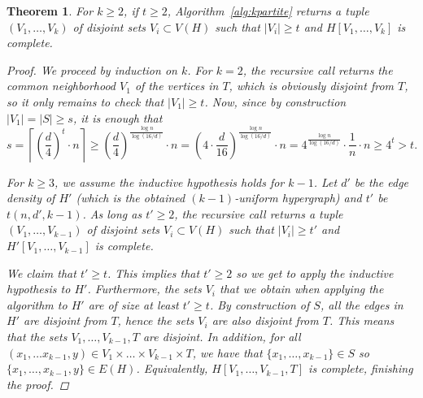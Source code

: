 \documentclass{amsart}
\newtheorem{theorem}[subsection]{Theorem}
\begin{document}
\begin{theorem}
    For $k \geq 2$, if $t \geq 2$, Algorithm~\ref{alg:kpartite} returns a tuple $(V_1, \dots, V_k)$ of disjoint sets $V_i \subset V(H)$ such that
    $|V_i| \geq t$ and $H[V_1, \dots, V_k]$ is complete.

    \begin{proof}
        We proceed by induction on $k$.
        For $k=2$, the recursive call returns the common neighborhood $V_1$ of the vertices in $T$,
        which is obviously disjoint from $T$, so it only remains to check that $|V_1| \geq t$.
        Now, since by construction $|V_1| = |S| \geq s$, it is enough that
        \[
            s
            = \left\lceil \left( \frac{d}{4}\right)^t \cdot n\right\rceil
            \geq \left( \frac{d}{4}\right)^{\frac{\log n}{\log(16/d)}}  \cdot n
            = \left( 4 \cdot \frac{d}{16}\right)^{\frac{\log n}{\log(16/d)}} \cdot n
            = 4^{\frac{\log n}{\log(16/d)}} \cdot \frac{1}{n} \cdot n
            \geq 4^t
            > t.
        \]

        For $k \geq 3$, we assume the inductive hypothesis holds for $k-1$.
        Let $d'$ be the edge density of $H'$ (which is the obtained $(k-1)$-uniform hypergraph)
        and $t'$ be $t(n, d', k-1)$.
        As long as $t' \geq 2$, the recursive call returns
        a tuple $(V_1, \dots, V_{k-1})$ of disjoint sets $V_i \subset V(H)$ such that
        $|V_i| \geq t'$ and $H'[V_1, \dots, V_{k-1}]$ is complete.

        We claim that $t' \geq t$.
        This implies that $t' \geq 2$ so we get to apply the inductive hypothesis to $H'$.
        Furthermore, the sets $V_i$ that we obtain when applying the algorithm to $H'$
        are of size at least $t' \geq t$.
        By construction of $S$, all the edges in $H'$ are disjoint from $T$,
        hence the sets $V_i$ are also disjoint from $T$.
        This means that the sets $V_1, \dots, V_{k-1}, T$ are disjoint.
        In addition, for all $(x_1, \dots x_{k-1}, y) \in V_1 \times \dots \times V_{k-1} \times T$,
        we have that $\{x_1, \dots, x_{k-1}\} \in S$ so $\{x_1, \dots, x_{k-1}, y\} \in E(H)$.
        Equivalently, $H[V_1, \dots, V_{k-1}, T]$ is complete, finishing the proof.


\end{proof}
\end{theorem}
\end{document}
